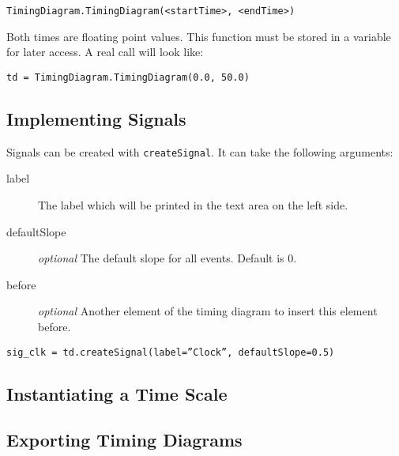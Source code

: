 \documentclass[11pt]{article}
\begin{document}
\begin{center}
  \texttt{TimingDiagram.TimingDiagram(<startTime>, <endTime>)}
\end{center}

Both times are floating point values.
This function must be stored in a variable for later access. A real call will
look like:

\begin{center}
  \texttt{td = TimingDiagram.TimingDiagram(0.0, 50.0)}
\end{center}

\subsection{Implementing Signals}
\label{sec:sig}

Signals can be created with \texttt{createSignal}. It can take the following
arguments:

\begin{description}
\item[label] The label which will be printed in the text area on the left side.
\item[defaultSlope] \emph{optional} The default slope for all events. Default is 0.
\item[before] \emph{optional} Another element of the timing diagram to insert this element before.  
\end{description}

\begin{center}
  \texttt{sig\_clk = td.createSignal(label=''Clock'', defaultSlope=0.5)}
\end{center}

\subsection{Instantiating a Time Scale}
\label{sec:tis}



\subsection{Exporting Timing Diagrams}
\label{sec:exp}
\end{document}

